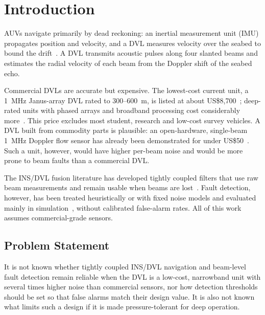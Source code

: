 \documentclass[conference]{IEEEtran}
\begin{document}
\section{Introduction}

AUVs navigate primarily by dead reckoning: an inertial measurement unit (IMU) propagates position and velocity, and a DVL measures velocity over the seabed to bound the drift~\cite{paull2014}. A DVL transmits acoustic pulses along four slanted beams and estimates the radial velocity of each beam from the Doppler shift of the seabed echo.

Commercial DVLs are accurate but expensive. The lowest-cost current unit, a 1~MHz Janus-array DVL rated to 300--600~m, is listed at about US\$8{,}700~\cite{wl_a50}; deep-rated units with phased arrays and broadband processing cost considerably more~\cite{tasman}. This price excludes most student, research and low-cost survey vehicles. A DVL built from commodity parts is plausible: an open-hardware, single-beam 1~MHz Doppler flow sensor has already been demonstrated for under US\$50~\cite{catsamas2022}. Such a unit, however, would have higher per-beam noise and would be more prone to beam faults than a commercial DVL.

The INS/DVL fusion literature has developed tightly coupled filters that use raw beam measurements and remain usable when beams are lost~\cite{tal2017,liu2018,yao2023,klein2020,klein2022,yona2023,cohen2024}. Fault detection, however, has been treated heuristically or with fixed noise models and evaluated mainly in simulation~\cite{zhu2025,yang2022}, without calibrated false-alarm rates. All of this work assumes commercial-grade sensors.

\subsection{Problem Statement}

It is not known whether tightly coupled INS/DVL navigation and beam-level fault detection remain reliable when the DVL is a low-cost, narrowband unit with several times higher noise than commercial sensors, nor how detection thresholds should be set so that false alarms match their design value. It is also not known what limits such a design if it is made pressure-tolerant for deep operation.
\end{document}
